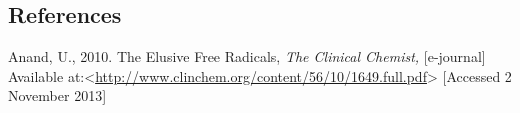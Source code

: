 \documentclass[12pt]{report}
\begin{document}
\newpage
\subsection*{References}

Anand, U., 2010. The Elusive Free Radicals, \textit{The Clinical Chemist,} [e-journal] Available at:<\url{http://www.clinchem.org/content/56/10/1649.full.pdf}> [Accessed 2 November 2013]






\iffalse
 \begin{lstlisting}
   //Java program to demonstrate FileNotFoundException 
import java.io.File; 
import java.io.FileNotFoundException; 
import java.io.FileReader; 
 class File_notFound_Demo { 
  
    public static void main(String args[])  { 
        try { 
  
            // Following file does not exist 
            File file = new File("E://file.txt"); 
  
            FileReader fr = new FileReader(file); 
        } catch (FileNotFoundException e) { 
           System.out.println("File does not exist"); 
        } 
    } 
} 
    \end{lstlisting}

\fi
\end{document}
